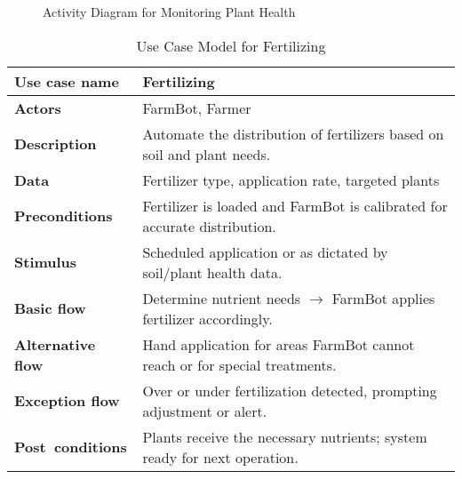\begin{figure}[H]
    \centering

\caption{Activity Diagram for Monitoring Plant Health}
\end{figure}

\begin{table}[H]
\centering
\begin{tabular}{|p{4cm}|p{9cm}|}
\hline
\textbf{Use case name}    & Fertilizing \\
\hline
\textbf{Actors}           & FarmBot, Farmer \\
\hline
\textbf{Description}      & Automate the distribution of fertilizers based on soil and plant needs. \\
\hline
\textbf{Data}             & Fertilizer type, application rate, targeted plants \\
\hline
\textbf{Preconditions}    & Fertilizer is loaded and FarmBot is calibrated for accurate distribution. \\
\hline
\textbf{Stimulus}         & Scheduled application or as dictated by soil/plant health data. \\
\hline
\textbf{Basic flow}       & Determine nutrient needs $\rightarrow$ FarmBot applies fertilizer accordingly. \\
\hline
\textbf{Alternative flow} & Hand application for areas FarmBot cannot reach or for special treatments. \\
\hline
\textbf{Exception flow}   & Over or under fertilization detected, prompting adjustment or alert. \\
\hline
\textbf{Post conditions}  & Plants receive the necessary nutrients; system ready for next operation. \\
\hline
\end{tabular}
\caption{Use Case Model for Fertilizing}
\end{table}

